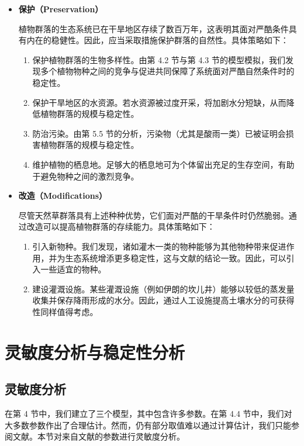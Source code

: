 \documentclass[11pt,a4paper]{ctexart}
\begin{document}
\begin{itemize}
\item \textbf{保护（Preservation）}

植物群落的生态系统已在干旱地区存续了数百万年，这表明其面对严酷条件具有内在的稳健性。因此，应当采取措施保护群落的自然性。具体策略如下：

\begin{enumerate}
\item 保护植物群落的生物多样性。由第 4.2 节与第 4.3 节的模型模拟，我们发现多个植物物种之间的竞争与促进共同保障了系统面对严酷自然条件时的稳定性。
\item 保护干旱地区的水资源。若水资源被过度开采，将加剧水分短缺，从而降低植物群落的规模与稳定性。
\item 防治污染。由第 5.5 节的分析，污染物（尤其是酸雨一类）已被证明会损害植物群落的规模与稳定性。
\item 维护植物的栖息地。足够大的栖息地可为个体留出充足的生存空间，有助于避免物种之间的激烈竞争。
\end{enumerate}

\item \textbf{改造（Modifications）}

尽管天然草群落具有上述种种优势，它们面对严酷的干旱条件时仍然脆弱。通过改造可以提高植物群落的存续能力。具体策略如下：

\begin{enumerate}
\item 引入新物种。我们发现，诸如灌木一类的物种能够为其他物种带来促进作用，并为生态系统增添更多稳定性，这与文献的结论一致。因此，可以引入一些适宜的物种。
\item 建设灌溉设施。某些灌溉设施（例如伊朗的坎儿井）能够以较低的蒸发量收集并保存降雨形成的水分。因此，通过人工设施提高土壤水分的可获得性同样值得考虑。
\end{enumerate}
\end{itemize}

\section{灵敏度分析与稳定性分析}

\subsection{灵敏度分析}

在第 4 节中，我们建立了三个模型，其中包含许多参数。在第 4.4 节中，我们对大多数参数作出了合理估计。然而，仍有部分取值难以通过计算估计，我们只能参阅文献。本节对来自文献的参数进行灵敏度分析。
\end{document}
